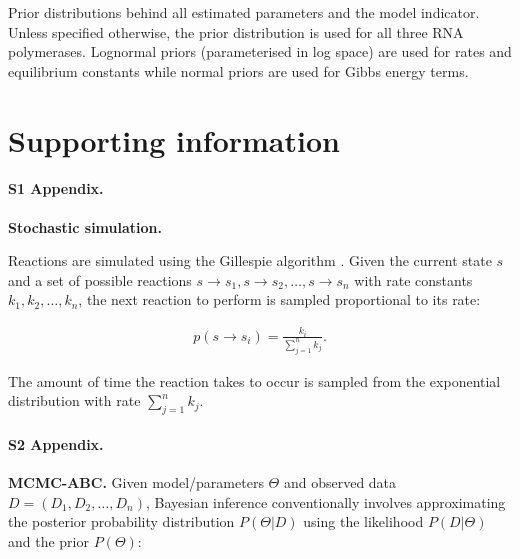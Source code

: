 \documentclass[10pt,letterpaper]{article}
\begin{document}
\begin{table}[!htb]
\begin{adjustwidth}{-2.25in}{0in}
{}


\label{S2_Table}

\begin{flushleft} Prior distributions behind all estimated parameters and the model indicator. Unless specified otherwise, the prior distribution is used for all three RNA polymerases. Lognormal priors (parameterised in log space) are used for rates and equilibrium constants while normal priors are used for Gibbs energy terms. 
\end{flushleft}
\label{table2}
\end{adjustwidth}
\end{table}







\section*{Supporting information}



\paragraph*{S1 Appendix.}
\label{S1_Appendix}
{\bf Stochastic simulation.} 


Reactions are simulated using the Gillespie algorithm \cite{gillespie1977exact}.  Given the current state $s$ and a set of possible reactions $s\rightarrow s_1, s\rightarrow s_2, \dotso, s\rightarrow s_n$ with rate constants $k_1, k_2, \dotso, k_n$, the next reaction to perform is sampled proportional to its rate:

\begin{eqnarray}
	p(s\rightarrow s_i) = \frac{k_i}{\sum\limits_{j=1}^n k_j}.
\end{eqnarray}

The amount of time the reaction takes to occur is sampled from the exponential distribution with rate $\sum\limits_{j=1}^n k_j$. \\






\paragraph*{S2 Appendix.}
\label{S2_Appendix}



{\bf MCMC-ABC.} Given model/parameters $\Theta$ and observed data $D = (D_1, D_2, \dotso, D_n)$, Bayesian inference conventionally involves approximating the posterior probability distribution $P(\Theta | D)$ using the likelihood $P(D|\Theta)$ and the prior $P(\Theta)$:
\end{document}
